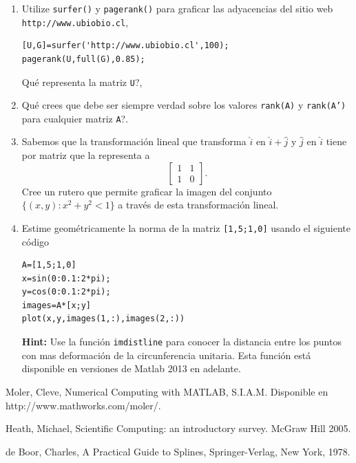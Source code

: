 \documentclass[11pt]{article}
\begin{document}
\begin{enumerate}
\item Utilize \texttt{surfer()} y \texttt{pagerank()} para graficar las adyacencias del sitio web \texttt{http://www.ubiobio.cl},
\begin{verbatim}
[U,G]=surfer('http://www.ubiobio.cl',100);
pagerank(U,full(G),0.85);
\end{verbatim}
\textquestiondown Qu\'e representa la matriz \texttt{U}?, 

\item \textquestiondown Qu\'e crees que debe ser siempre verdad sobre los valores \texttt{rank(A)} y \texttt{rank(A')} para cualquier matriz \texttt{A}?.

\item Sabemos que la transformaci\'on lineal que transforma $\hat{i}$ en $\hat{i} + \hat{j}$ y $\hat{j}$ en $\hat{i}$ tiene por matriz que la representa a 
$$
\begin{bmatrix}
1 & 1 \\
1 & 0
\end{bmatrix}.
$$
Cree un rutero que permite graficar la imagen del conjunto $\{(x,y):x^2+y^2<1\}$  a trav\'es de esta transformaci\'on lineal.

\item Estime geom\'etricamente la norma de la matriz \texttt{[1,5;1,0]} usando el siguiente c\'odigo
\begin{verbatim}
A=[1,5;1,0]
x=sin(0:0.1:2*pi);
y=cos(0:0.1:2*pi);
images=A*[x;y]
plot(x,y,images(1,:),images(2,:))
\end{verbatim}

\textbf{Hint:} Use la funci\'on \texttt{imdistline} para conocer la distancia entre los puntos con mas deformaci\'on de la circunferencia unitaria. Esta funci\'on est\'a disponible en versiones de Matlab 2013 en adelante.

\end{enumerate}


\begin{thebibliography}{9}


 Moler, Cleve, Numerical Computing with MATLAB, S.I.A.M. Disponible en http://www.mathworks.com/moler/.

 Heath, Michael, Scientific Computing: an introductory survey. McGraw Hill 2005.

 de Boor, Charles, A Practical Guide to Splines, Springer-Verlag, New York, 1978.


\end{thebibliography}
\end{document}
